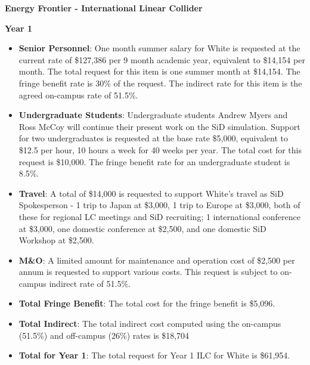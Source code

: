 \textbf{Energy Frontier - International Linear Collider}

\textbf{Year 1}

\begin{itemize}

\item{{\bf Senior Personnel}: One month summer salary for White is requested at the current rate of \$127,386 per 9 month academic year, 
equivalent to \$14,154 per month.  The total request for this item is one summer month at \$14,154. The fringe benefit rate is 30\% of the request.  
The indirect rate for this item is the agreed on-campus rate of 51.5\%.}

\item {{\bf Undergraduate Students}: Undergraduate students Andrew Myers and Ross McCoy will continue their present work on the SiD simulation.
Support for two undergraduates is requested at the base rate \$5,000, equivalent to \$12.5 per hour, 10 hours a week for 40 weeks per year.  
The total cost for this request is \$10,000.  The fringe benefit rate for an undergraduate student is 8.5\%.}

\item{{\bf Travel}: A total of \$14,000 is requested to support White's travel as SiD Spokesperson - 1 trip to Japan at \$3,000, 1 trip to
Europe at \$3,000, both of these for regional LC meetings and SiD recruiting; 1 international conference at \$3,000, one domestic conference 
at \$2,500, and one domestic SiD Workshop at \$2,500.}

\item {{\bf M\&O}: A limited amount for maintenance and operation cost of \$2,500 per annum is requested to support various costs.   
This request is subject to on-campus indirect rate of 51.5\%.}

\item {{\bf Total Fringe Benefit}: The total cost for the fringe benefit is \$5,096.}

\item {{\bf Total Indirect}: The total indirect cost computed using the on-campus (51.5\%) and off-campus (26\%) rates is \$18,704}

\item {{\bf Total for Year 1}: The total request for Year 1 ILC for White is \$61,954.}

\end{itemize}